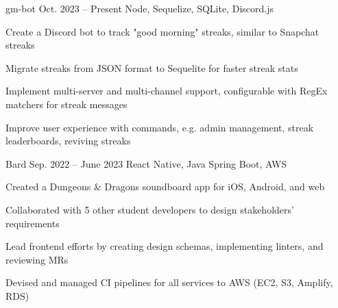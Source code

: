 \fontdir[fonts/]

\begin{cvprojects}

  \cvproject
  {gm-bot}
  {\href{https://github.com/KevinIsMyName/gm-bot}{\faGithubSquare\acvHeaderIconSep\@KevinIsMyName}}
  {Oct. 2023 -- Present}
  {Node, Sequelize, SQLite, Discord.js}
  {
    \begin{cvitems}
      \item Create a Discord bot to track "good morning" streaks, similar to Snapchat streaks
      \item Migrate streaks from JSON format to Sequelite for faster streak stats
      \item Implement multi-server and multi-channel support, configurable with RegEx matchers for streak messages
      \item Improve user experience with commands, e.g. admin management, streak leaderboards, reviving streaks
    \end{cvitems}
  }


  \cvproject
  {Bard}
  {\href{https://gitlab.com/drexel_se/senior_project/ay22_bard/bard}{\faGithubSquare\acvHeaderIconSep\@KevinIsMyName}}
  {Sep. 2022 -- June 2023}
  {React Native, Java Spring Boot, AWS}
  {
    \begin{cvitems}
      \item Created a Dungeons \& Dragons soundboard app for iOS, Android, and web
      \item Collaborated with 5 other student developers to design stakeholders' requirements
      \item Lead frontend efforts by creating design schemas, implementing linters, and reviewing MRs
      \item Devised and managed CI pipelines for all services to AWS (EC2, S3, Amplify, RDS)
    \end{cvitems}
  }




\end{cvprojects}
